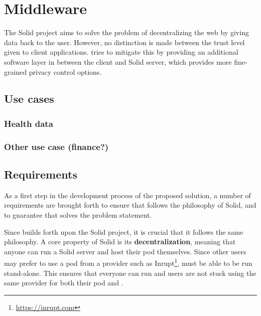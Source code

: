 \chapter{Middleware}
\label{cha:middleware}
The Solid project aims to solve the problem of decentralizing the web by giving data back to the user. However, no distinction is made between the trust level given to client applications. \middleware{} tries to mitigate this by providing an additional software layer in between the client and Solid server, which provides more fine-grained privacy control options. 

\section{Use cases}
\subsection{Health data}

\subsection{Other use case (finance?)}

\section{Requirements}

As a first step in the development process of the proposed solution, a number of requirements are brought forth to ensure that \middleware{} follows the philosophy of Solid, and to guarantee that solves the problem statement.

Since \middleware{} builds forth upon the Solid project, it is crucial that it follows the same philosophy. A core property of Solid is its \textbf{decentralization}, meaning that anyone can run a Solid server and host their pod themselves. Since other users may prefer to use a pod from a provider such as Inrupt\footnote{\url{https://inrupt.com}}, \middleware{} must be able to be run stand-alone. This ensures that 
everyone can run \middleware{} and users are not stuck using the same provider for both their pod and \middleware{}.

